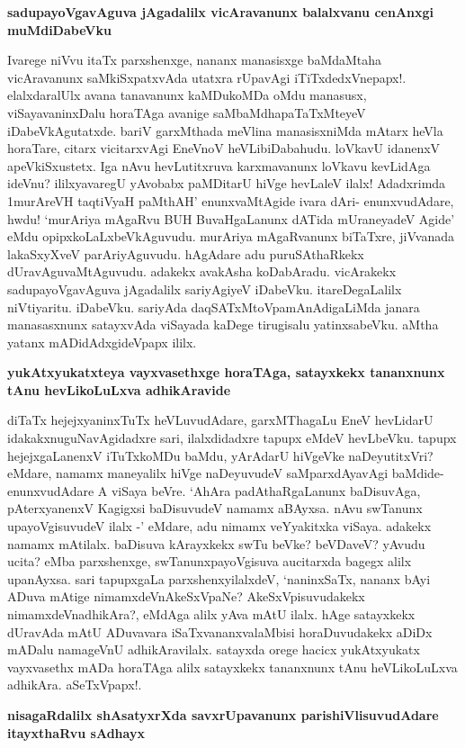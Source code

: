 {\bf sadupayoVgavAguva jAgadalilx vicAravanunx balalxvanu cenAnxgi muMdiDabeVku}

Ivarege niVvu itaTx parxshenxge, nananx manasisxge baMdaMtaha vicAravanunx saMkiSxpatxvAda utatxra rUpavAgi iTiTxdedxVnepapx!. elalxdaralUlx avana tanavanunx kaMDukoMDa oMdu manasusx, viSayavaninxDalu horaTAga avanige saMbaMdhapaTaTxMteyeV iDabeVkAgutatxde. bariV garxMthada meVlina manasisxniMda mAtarx heVla horaTare, citarx vicitarxvAgi EneVnoV heVLibiDabahudu. loVkavU idanenxV apeVkiSxustetx. Iga nAvu hevLutitxruva karxmavanunx loVkavu kevLidAga ideVnu? ililxyavaregU yAvobabx paMDitarU hiVge hevLaleV ilalx! Adadxrimda 1murAreVH taqtiVyaH paMthAH' enunxvaMtAgide ivara dAri- enunxvudAdare, hwdu! `murAriya mAgaRvu BUH BuvaHgaLanunx dATida mUraneyadeV Agide' eMdu opipxkoLaLxbeVkAguvudu. murAriya mAgaRvanunx biTaTxre, jiVvanada lakaSxyXveV parAriyAguvudu. hAgAdare adu puruSAthaRkekx dUravAguvaMtAguvudu. adakekx avakAsha koDabAradu. vicArakekx sadupayoVgavAguva jAgadalilx sariyAgiyeV iDabeVku. itareDegaLalilx niVtiyaritu. iDabeVku. sariyAda daqSATxMtoVpamAnAdigaLiMda janara manasasxnunx satayxvAda viSayada kaDege tirugisalu yatinxsabeVku. aMtha yatanx mADidAdxgideVpapx ililx.

{\bf yukAtxyukatxteya vayxvasethxge horaTAga, satayxkekx tananxnunx tAnu hevLikoLuLxva adhikAravide}

diTaTx hejejxyaninxTuTx heVLuvudAdare, garxMThagaLu EneV hevLidarU idakakxnuguNavAgidadxre sari, ilalxdidadxre tapupx eMdeV hevLbeVku. tapupx hejejxgaLanenxV iTuTxkoMDu baMdu, yArAdarU hiVgeVke naDeyutitxVri? eMdare, namamx maneyalilx hiVge naDeyuvudeV saMparxdAyavAgi baMdide- enunxvudAdare A viSaya beVre. `AhAra padAthaRgaLanunx baDisuvAga, pAterxyanenxV Kagigxsi baDisuvudeV namamx aBAyxsa. nAvu swTanunx upayoVgisuvudeV ilalx -' eMdare, adu nimamx veYyakitxka viSaya. adakekx namamx mAtilalx. baDisuva kArayxkekx swTu beVke? beVDaveV? yAvudu ucita? eMba parxshenxge, swTanunxpayoVgisuva aucitarxda bagegx alilx upanAyxsa. sari tapupxgaLa parxshenxyilalxdeV, `naninxSaTx, nananx bAyi ADuva mAtige nimamxdeVnAkeSxVpaNe? AkeSxVpisuvudakekx nimamxdeVnadhikAra?, eMdAga alilx yAva mAtU ilalx. hAge satayxkekx dUravAda mAtU ADuvavara iSaTxvananxvalaMbisi horaDuvudakekx aDiDx mADalu namageVnU adhikAravilalx. satayxda orege hacicx yukAtxyukatx vayxvasethx mADa horaTAga alilx satayxkekx tananxnunx tAnu heVLikoLuLxva adhikAra. aSeTxVpapx!.

{\bf nisagaRdalilx shAsatyxrXda savxrUpavanunx parishiVlisuvudAdare itayxthaRvu sAdhayx}

